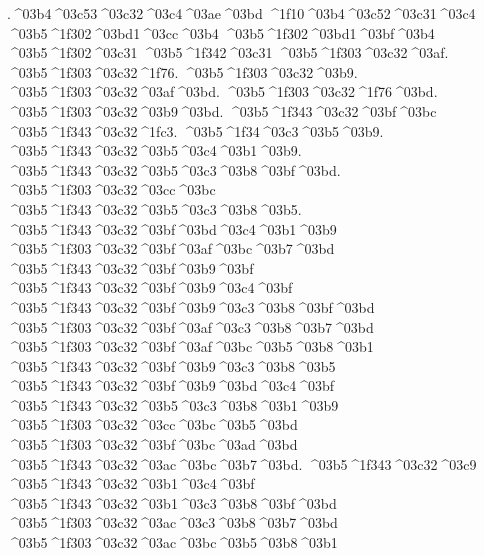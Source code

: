 {	.^^^^03b4^^^^03c53^^^^03c32^^^^03c4^^^^03ae^^^^03bd
^^^^1f10^^^^03b4^^^^03c52^^^^03c31^^^^03c4 		%
^^^^03b5^^^^1f302^^^^03bd1^^^^03cc^^^^03b4   		%
^^^^03b5^^^^1f302^^^^03bd1^^^^03bf^^^^03b4
^^^^03b5^^^^1f302^^^^03c31  		%
^^^^03b5^^^^1f342^^^^03c31
	^^^^03b5^^^^1f303^^^^03c32^^^^03af.   		%
	^^^^03b5^^^^1f303^^^^03c32^^^^1f76.
	^^^^03b5^^^^1f303^^^^03c32^^^^03b9.
	^^^^03b5^^^^1f303^^^^03c32^^^^03af^^^^03bd.
	^^^^03b5^^^^1f303^^^^03c32^^^^1f76^^^^03bd.
	^^^^03b5^^^^1f303^^^^03c32^^^^03b9^^^^03bd.
	^^^^03b5^^^^1f343^^^^03c32^^^^03bf^^^^03bc   		%
	^^^^03b5^^^^1f343^^^^03c32^^^^1fc3. ^^^^03b5^^^^1f34^^^^03c3^^^^03b5^^^^03b9.
	^^^^03b5^^^^1f343^^^^03c32^^^^03b5^^^^03c4^^^^03b1^^^^03b9.
	^^^^03b5^^^^1f343^^^^03c32^^^^03b5^^^^03c3^^^^03b8^^^^03bf^^^^03bd.
	^^^^03b5^^^^1f303^^^^03c32^^^^03cc^^^^03bc		%
	^^^^03b5^^^^1f343^^^^03c32^^^^03b5^^^^03c3^^^^03b8^^^^03b5.
	^^^^03b5^^^^1f343^^^^03c32^^^^03bf^^^^03bd^^^^03c4^^^^03b1^^^^03b9
%
	^^^^03b5^^^^1f303^^^^03c32^^^^03bf^^^^03af^^^^03bc^^^^03b7^^^^03bd
	^^^^03b5^^^^1f343^^^^03c32^^^^03bf^^^^03b9^^^^03bf
	^^^^03b5^^^^1f343^^^^03c32^^^^03bf^^^^03b9^^^^03c4^^^^03bf
	^^^^03b5^^^^1f343^^^^03c32^^^^03bf^^^^03b9^^^^03c3^^^^03b8^^^^03bf^^^^03bd
	^^^^03b5^^^^1f303^^^^03c32^^^^03bf^^^^03af^^^^03c3^^^^03b8^^^^03b7^^^^03bd
	^^^^03b5^^^^1f303^^^^03c32^^^^03bf^^^^03af^^^^03bc^^^^03b5^^^^03b8^^^^03b1
	^^^^03b5^^^^1f343^^^^03c32^^^^03bf^^^^03b9^^^^03c3^^^^03b8^^^^03b5
	^^^^03b5^^^^1f343^^^^03c32^^^^03bf^^^^03b9^^^^03bd^^^^03c4^^^^03bf
%
	^^^^03b5^^^^1f343^^^^03c32^^^^03b5^^^^03c3^^^^03b8^^^^03b1^^^^03b9
	^^^^03b5^^^^1f303^^^^03c32^^^^03cc^^^^03bc^^^^03b5^^^^03bd		%
	^^^^03b5^^^^1f303^^^^03c32^^^^03bf^^^^03bc^^^^03ad^^^^03bd
%
	^^^^03b5^^^^1f343^^^^03c32^^^^03ac^^^^03bc^^^^03b7^^^^03bd.
	^^^^03b5^^^^1f343^^^^03c32^^^^03c9
	^^^^03b5^^^^1f343^^^^03c32^^^^03b1^^^^03c4^^^^03bf
	^^^^03b5^^^^1f343^^^^03c32^^^^03b1^^^^03c3^^^^03b8^^^^03bf^^^^03bd
	^^^^03b5^^^^1f303^^^^03c32^^^^03ac^^^^03c3^^^^03b8^^^^03b7^^^^03bd
	^^^^03b5^^^^1f303^^^^03c32^^^^03ac^^^^03bc^^^^03b5^^^^03b8^^^^03b1
}
